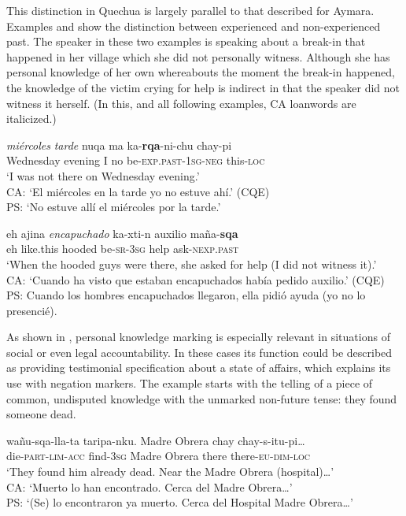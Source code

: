 \documentclass[output=paper,hidelinks]{langscibook}
\begin{document}
This distinction in Quechua is largely parallel to that described for Aymara. Examples  and  show the distinction between experienced and non-experien\-ced past. The speaker in these two examples is speaking about a break-in that happened in her village which she did not personally witness. Although she has personal knowledge of her own whereabouts the moment the break-in happened, the knowledge of the victim crying for help is indirect in that the speaker did not witness it herself. (In this, and all following examples, CA loanwords are italicized.)

\ea \label{ex:Qnonex}
\gll \textit{miércoles} \textit{tarde} nuqa ma ka-\textbf{rqa}-ni-chu chay-pi \\
Wednesday evening I no be-\textsc{exp.past-1sg-neg} this-\textsc{loc} \\
\glt ‘I was not there on Wednesday evening.’\\
CA: `El miércoles en la tarde yo no estuve ahí.' (CQE)\\
PS: `No estuve allí el miércoles por la tarde.'
\z

\ea \label{ex:Qnonex2}
\gll eh ajina \textit{encapuchado} ka-xti-n auxilio maña-\textbf{sqa} \\
eh like.this hooded be-\textsc{sr-3sg} help ask-\textsc{nexp.past} \\ 
\glt ‘When the hooded guys were there, she asked for help (I did not witness it).’ \citep[96]{dankel2012convergencias} \\
CA: `Cuando ha visto que estaban encapuchados hab\'{i}a pedido auxilio.' (CQE)\\ 
PS: Cuando los hombres encapuchados llegaron, ella pidió ayuda (yo no lo presencié).

\z

As shown in , personal knowledge marking is especially relevant in situations of social or even legal accountability. In these cases its function could be described as providing testimonial specification about a state of affairs, which explains its use with negation markers. The example starts with the telling of a piece of common, undisputed knowledge with the unmarked non-future tense: they found someone dead.

\ea \label{ex:Q-find}
\gll wañu-sqa-lla-ta taripa-nku. Madre Obrera chay chay-s-itu-pi\ldots \\
die-\textsc{part-lim-acc} find-\textsc{3sg} Madre Obrera there there-\textsc{eu-dim-loc} \\ 
\glt ‘They found him already dead. Near the Madre Obrera (hospital)\ldots’ \citep[165]{soto2002interferencia}\\
CA: `Muerto lo han encontrado. Cerca del Madre Obrera\ldots' \\
PS: `(Se) lo encontraron ya muerto. Cerca del Hospital Madre Obrera\ldots'
\z
\end{document}
